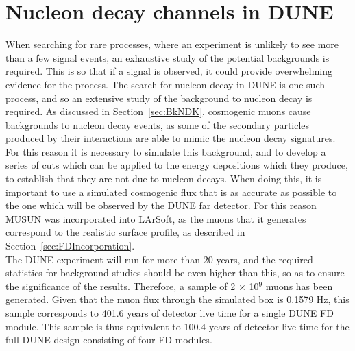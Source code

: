 \section{Nucleon decay channels in DUNE} \label{sec:DUNENDK} %
When searching for rare processes, where an experiment is unlikely to see more than a few signal events, an exhaustive study of the potential backgrounds is required. This is so that if a signal is observed, it could provide overwhelming evidence for the process. The search for nucleon decay in DUNE is one such process, and so an extensive study of the background to nucleon decay is required. As discussed in Section~\ref{sec:BkNDK}, cosmogenic muons cause backgrounds to nucleon decay events, as some of the secondary particles produced by their interactions are able to mimic the nucleon decay signatures. For this reason it is necessary to simulate this background, and to develop a series of cuts which can be applied to the energy depositions which they produce, to establish that they are not due to nucleon decays. When doing this, it is important to use a simulated cosmogenic flux that is as accurate as possible to the one which will be observed by the DUNE far detector. For this reason MUSUN was incorporated into LArSoft, as the muons that it generates correspond to the realistic surface profile, as described in Section~\ref{sec:FDIncorporation}. \\

The DUNE experiment will run for more than 20 years, and the required statistics for background studies should be even higher than this, so as to ensure the significance of the results. Therefore, a sample of 2 $\times$ 10$^{9}$ muons has been generated. Given that the muon flux through the simulated box is 0.1579 Hz, this sample corresponds to 401.6 years of detector live time for a single DUNE FD module. This sample is thus equivalent to 100.4 years of detector live time for the full DUNE design consisting of four FD modules. \\

